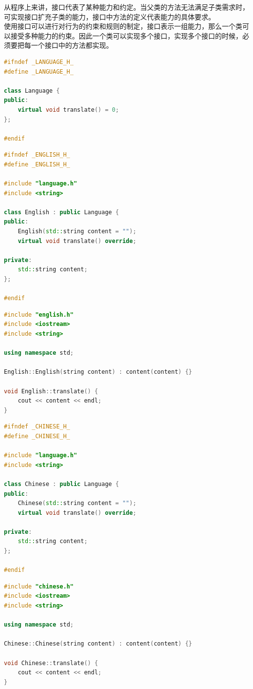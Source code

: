 从程序上来讲，接口代表了某种能力和约定。当父类的方法无法满足子类需求时，可实现接口扩充子类的能力，接口中方法的定义代表能力的具体要求。\\

使用接口可以进行对行为的约束和规则的制定，接口表示一组能力，那么一个类可以接受多种能力的约束。因此一个类可以实现多个接口，实现多个接口的时候，必须要把每一个接口中的方法都实现。\\


\begin{lstlisting}[language=C++, title=language.h]
#ifndef _LANGUAGE_H_
#define _LANGUAGE_H_

class Language {
public:
	virtual void translate() = 0;
};

#endif
\end{lstlisting}

\begin{lstlisting}[language=C++, title=english.h]
#ifndef _ENGLISH_H_
#define _ENGLISH_H_

#include "language.h"
#include <string>

class English : public Language {
public:
	English(std::string content = "");
	virtual void translate() override;

private:
	std::string content;
};

#endif
\end{lstlisting}

\begin{lstlisting}[language=C++, title=english.cpp]
#include "english.h"
#include <iostream>
#include <string>

using namespace std;

English::English(string content) : content(content) {}

void English::translate() {
	cout << content << endl;
}
\end{lstlisting}

\begin{lstlisting}[language=C++, title=chinese.h]
#ifndef _CHINESE_H_
#define _CHINESE_H_

#include "language.h"
#include <string>

class Chinese : public Language {
public:
	Chinese(std::string content = "");
	virtual void translate() override;

private:
	std::string content;
};

#endif
\end{lstlisting}

\begin{lstlisting}[language=C++, title=chinese.cpp]
#include "chinese.h"
#include <iostream>
#include <string>

using namespace std;

Chinese::Chinese(string content) : content(content) {}

void Chinese::translate() {
	cout << content << endl;
}
\end{lstlisting}

